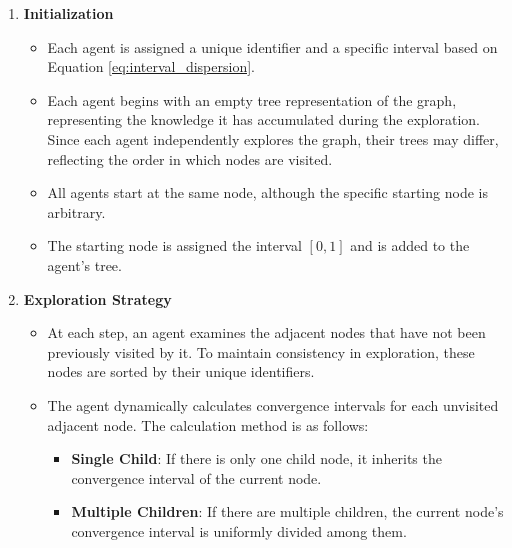 \begin{enumerate}
    \item \textbf{Initialization}
    \begin{itemize}
        \item Each agent is assigned a unique identifier and a specific interval based on Equation \ref{eq:interval_dispersion}.
        \item Each agent begins with an empty tree representation of the graph, representing the knowledge it has accumulated during the exploration. Since each agent independently explores the graph, their trees may differ, reflecting the order in which nodes are visited.
        \item All agents start at the same node, although the specific starting node is arbitrary.
        \item The starting node is assigned the interval $[0,1]$ and is added to the agent's tree.
    \end{itemize}
    \item \textbf{Exploration Strategy}
    \begin{itemize}
        \item At each step, an agent examines the adjacent nodes that have not been previously visited by it. To maintain consistency in exploration, these nodes are sorted by their unique identifiers.
        \item The agent dynamically calculates convergence intervals for each unvisited adjacent node. The calculation method is as follows:
        \begin{itemize}

            \item \textbf{Single Child}: If there is only one child node, it inherits the convergence interval of the current node.
            
            \item \textbf{Multiple Children}: If there are multiple children, the current node's convergence interval is uniformly divided among them.
            

\end{itemize}
\end{itemize}
\end{enumerate}

